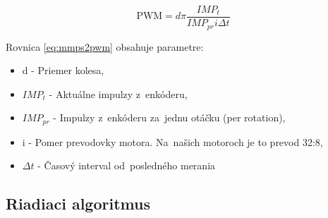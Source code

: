 \begin{equation}
	\text{PWM} = d \pi \frac{IMP_t}{IMP_{pr} i \Delta t}
	\label{eq:mmps2pwm}
\end{equation}

Rovnica \ref{eq:mmps2pwm} obsahuje parametre:
\begin{itemize}
	\item d - Priemer kolesa,
	\item $IMP_t$ - Aktuálne impulzy z~enkóderu,
	\item $IMP_{pr}$ - Impulzy z~enkóderu za~jednu otáčku (per rotation),
	\item i - Pomer prevodovky motora. Na~našich motoroch je to prevod 32:8,
	\item $\Delta t$ - Časový interval od~posledného merania
\end{itemize}


\subsection{Riadiaci algoritmus}

